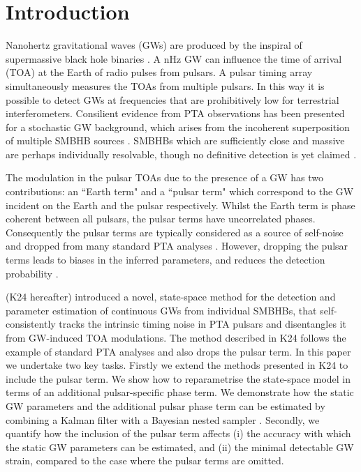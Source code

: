 \documentclass[fleqn,usenatbib,useAMS]{mnras}
\begin{document}
\section{Introduction}\label{sec:intro}
Nanohertz gravitational waves (GWs) are produced by the inspiral of supermassive black hole binaries \citep[SMBHBs;][]{Rajagopal1995,Jaffe_2003, Wyithe2003,Sesana2013,McWilliams_2014,Ravi2015MNRAS.447.2772R,Burke2019, Skyes2022}. A nHz GW can influence the time of arrival (TOA) at the Earth of radio pulses from pulsars. A pulsar timing array \citep[PTA;][]{ Tiburzi2018, 2021hgwa.bookE...4V} simultaneously measures the TOAs from multiple pulsars. In this way it is possible to detect GWs at frequencies that are prohibitively low for terrestrial interferometers. Consilient evidence from PTA observations has been presented \citep{2023ApJ...951L...8A,2023arXiv230616214A,2023ApJ...951L...6R,2023RAA....23g5024X} for a stochastic GW background, which arises from the incoherent superposition of multiple SMBHB sources \citep{Allen1997,Sesana10,Christensen2019,Renzini2022}. SMBHBs which are sufficiently close and massive are perhaps individually resolvable, though no definitive detection is yet claimed \citep{Jenet2004,Zhu2014PPTA,Babak2016,Arzoumanian2023,2023arXiv230616226A}. \newline 

The modulation in the pulsar TOAs due to the presence of a GW has two contributions: an ``Earth term" and a ``pulsar term" which correspond to the GW incident on the Earth and the pulsar respectively. Whilst the Earth term is phase coherent between all pulsars, the pulsar terms have uncorrelated phases. Consequently the pulsar terms are typically considered as a source of self-noise and dropped from many standard PTA analyses \citep[e.g.][]{Sesana2010,Babak2012,Petiteau2013,Zhu2015,Taylors2016,Goldstein2018,Charisi2023arXiv230403786C}. However, dropping the pulsar terms leads to biases in the inferred parameters, and reduces the detection probability \citep{Zhupulsarterms,Chen2022,KimpsonPTA}. \newline 

\cite{KimpsonPTA} (K24 hereafter) introduced a novel, state-space method for the detection and parameter estimation of continuous GWs from individual SMBHBs, that self-consistently tracks the intrinsic timing noise in PTA pulsars \citep[e.g.][]{Shannon2010,Lasky2015,Caballero2016,Goncharov2021} and disentangles it from GW-induced TOA modulations. The method described in K24 follows the example of standard  PTA analyses and also drops the pulsar term. In this paper we undertake two key tasks. Firstly we extend the methods presented in K24 to include the pulsar term. We show how to reparametrise the state-space model in terms of an additional pulsar-specific phase term. We demonstrate how the static GW parameters and the additional pulsar phase term can be estimated by combining a Kalman filter \citep{Kalman1} with a Bayesian nested sampler \citep{Skilling, Ashton2022}. Secondly, we quantify how the inclusion of the pulsar term affects (i) the accuracy with which the static GW parameters can be estimated, and (ii) the minimal detectable GW strain, compared to the case where the pulsar terms are omitted.  \newline 
\end{document}
